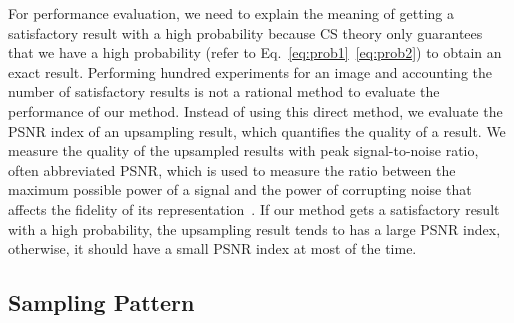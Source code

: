 \documentclass[preprint,10pt,5p,times,twocolumn]{elsarticle}
\begin{document}
For performance evaluation, we need to explain the meaning of getting a satisfactory result with a high probability because CS theory only guarantees that we have a high probability (refer to Eq.~\eqref{eq:prob1}~\eqref{eq:prob2}) to obtain an exact result. Performing hundred experiments for an image and accounting the number of satisfactory results is not a rational method to evaluate the performance of our method. Instead of using this direct method, we evaluate the PSNR index of an upsampling result, which quantifies the quality of a result. We measure the quality of the upsampled results with peak signal-to-noise ratio, often abbreviated PSNR, which is used to measure the ratio between the maximum possible power of a signal and the power of corrupting noise that affects the fidelity of its representation~\cite{Huynh2008}. If our method gets a satisfactory result with a high probability, the upsampling result tends to has a large PSNR index, otherwise, it should have a small PSNR index at most of the time.

\subsection{Sampling Pattern}

\begin{table}[t]
\caption{The quality evaluation indices at different regions with four upsampling rates. The table illustrates the PSNR indices of the upsampling results of Books, Dolls, Moebius and Plastic. We can observe that the PSNR indices of homogenous  regions and border region are rather stable for 2X, 4X and 8X upsampling rates. }
\label{Tab:evaluation}
\end{table}
\end{document}
